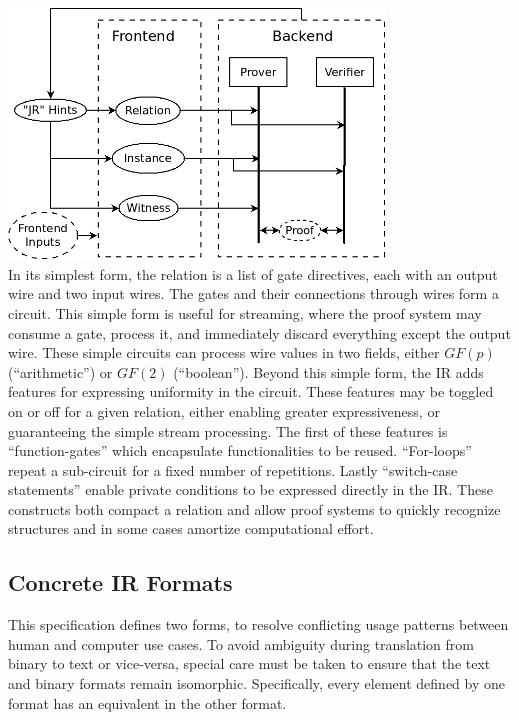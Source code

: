 \documentclass[12pt]{article}
\begin{document}
\noindent \includegraphics[width=0.75\textwidth,center]{ir-dataflow.png} \\

In its simplest form, the relation is a list of gate directives, each with an output wire and two input wires.
The gates and their connections through wires form a circuit.
This simple form is useful for streaming, where the proof system may consume a gate, process it, and immediately discard everything except the output wire.
These simple circuits can process wire values in two fields, either $GF(p)$ (``arithmetic'') or $GF(2)$ (``boolean'').
Beyond this simple form, the IR adds features for expressing uniformity in the circuit.
These features may be toggled on or off for a given relation, either enabling greater expressiveness, or guaranteeing the simple stream processing.
The first of these features is ``function-gates'' which encapsulate functionalities to be reused.
``For-loops'' repeat a sub-circuit for a fixed number of repetitions.
Lastly ``switch-case statements'' enable private conditions to be expressed directly in the IR.
These constructs both compact a relation and allow proof systems to quickly recognize structures and in some cases amortize computational effort.\\

\subsection{Concrete IR Formats}
This specification defines two forms, to resolve conflicting usage patterns between human and computer use cases.
To avoid ambiguity during translation from binary to text or vice-versa, special care must be taken to ensure that the text and binary formats remain isomorphic.
Specifically, every element defined by one format has an equivalent in the other format.\\
\end{document}
